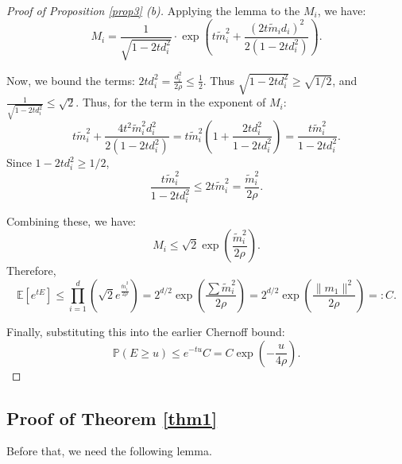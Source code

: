 \documentclass[a4paper,11pt]{article}
\theoremstyle{plain}
\theoremstyle{definition}
\begin{document}
\begin{proof}[Proof of Proposition \ref{prop3} (b)]
    Applying the lemma to the $M_i$, we have: 
    $$M_i =  \frac{1}{\sqrt{1 - 2t d_i^2}} \cdot \exp\left( t\tilde{m}_i^2 + \frac{(2t\tilde{m}_i d_i)^2}{2(1 - 2t d_i^2)} \right).$$ 

    Now, we bound the terms:
    $2t d_i^2 = \frac{d_i^2}{2\rho} \leq \frac{1}{2}$. Thus $\sqrt{1 - 2t d_i^2} \geq \sqrt{1/2}$, and $\frac{1}{\sqrt{1 - 2t d_i^2}} \leq \sqrt{2}$. 
    Thus, for the term in the exponent of $M_i$:
    $$t\tilde{m}_i^2 + \frac{4t^2 \tilde{m}_i^2 d_i^2}{2(1 - 2t d_i^2)} = t\tilde{m}_i^2 \left( 1 + \frac{2t d_i^2}{1 - 2t d_i^2} \right) = \frac{t\tilde{m}_i^2}{1 - 2t d_i^2}.$$ 
    Since $1 - 2t d_i^2 \geq 1/2$, 
    $$\frac{t\tilde{m}_i^2}{1 - 2t d_i^2} \leq 2t\tilde{m}_i^2 = \frac{\tilde{m}_i^2}{2\rho}.$$
    
    Combining these, we have:
    $$M_i \leq \sqrt{2} \exp\left( \frac{\tilde{m}_i^2}{2\rho} \right).$$ 
    Therefore, 
    $$\mathbb{E}[e^{tE}] \leq \prod_{i=1}^d \left( \sqrt{2} e^{\frac{\tilde{m}_i^2}{2\rho}} \right) = 2^{d/2} \exp\left( \frac{\sum \tilde{m}_i^2}{2\rho} \right) = 2^{d/2} \exp\left( \frac{\|m_1\|^2}{2\rho} \right) =: C.$$
    
    Finally, substituting this into the earlier Chernoff bound: $$\mathbb{P}(E \geq u) \leq e^{-tu} C = C \exp\left( -\frac{u}{4\rho} \right).$$
    
\end{proof}




\subsection{Proof of Theorem \ref{thm1}}
Before that, we need the following lemma.
\end{document}
